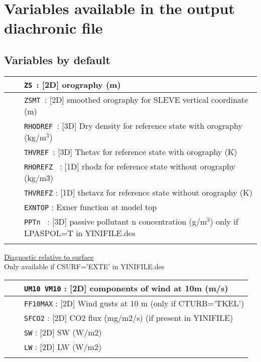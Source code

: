 \section{Variables available in the output diachronic file} \label{s:diag_list}

\subsection{Variables by default}
\begin{center}
\begin{tabular}{>{\centering}p{3cm}>{\centering}p{2.5cm}|p{11cm}|}
\cline{3-3}
&&{\tt ZS }: [2D] orography (m)  \\ \cline{3-3}
&&{\tt ZSMT }: [2D] smoothed orography for SLEVE vertical coordinate (m)  \\ \cline{3-3}
&&{\tt RHODREF }: [3D] Dry density for reference state with orography (kg/m$^3$)  \\ \cline{3-3}
&&{\tt THVREF }: [3D] Thetav for reference state with orography (K)  \\ \cline{3-3}
&&{\tt RHOREFZ } : [1D] rhodz for reference state without orography (kg/m3)  \\ \cline{3-3}
&&{\tt THVREFZ} : [1D] thetavz for reference state without orography (K) \\ \cline{3-3}
&&{\tt EXNTOP} :  Exner function at model top\\ \cline{3-3}
&&{\tt PPTn } : [3D] passive pollutant n concentration (g/m$^3$) only if LPASPOL=T in YINIFILE.des\\ \cline{3-3}
\end{tabular} 
\end{center}
\underline{Diagnostic relative to surface}\\
Only available if CSURF='EXTE' in YINIFILE.des
\begin{center}
\begin{tabular}{>{\centering}p{3cm}>{\centering}p{2.5cm}|p{11cm}|}
\cline{3-3}
&&{\tt UM10 VM10} : [2D] components of wind at 10m (m/s)\\\cline{3-3}
&&{\tt FF10MAX} : [2D] Wind gusts at 10 m (only if CTURB='TKEL')\\ \cline{3-3}
&&{\tt SFCO2} : [2D] CO2 flux (mg/m2/s) (if present in YINIFILE)\\ \cline{3-3}
&&{\tt SW} : [2D] SW (W/m2)\\ \cline{3-3}
&&{\tt LW} : [2D] LW (W/m2) \\ \cline{3-3}
\end{tabular} 
\end{center}
\newpage
